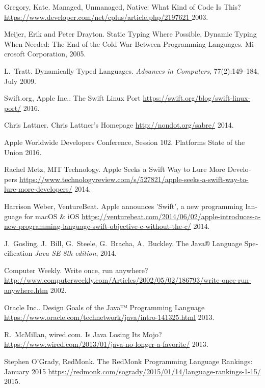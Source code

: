 \begin{thebibliography}{1}
\bibitem{[DEV+03]} {\textlatin{
{Gregory, Kate}.
Managed, Unmanaged, Native: What Kind of Code Is This?
\url{https://www.developer.com/net/cplus/article.php/2197621 }
  2003}}.
  
\bibitem{[MIC05]} {\textlatin{
Meijer, Erik and Peter Drayton. Static Typing Where Possible, Dynamic Typing When Needed: The End of the Cold War Between Programming Languages. Microsoft Corporation, 2005}}.  

\bibitem{[ADV09]} {\textlatin{
L.~Tratt. Dynamically Typed Languages. {\em Advances in Computers}, 77(2):149--184, July 2009}}.  
 
\bibitem{[SWIFT1+16]} {\textlatin{
{Swift.org, Apple Inc.}.
The Swift Linux Port
\url{https://swift.org/blog/swift-linux-port/}
  2016}}.
  
\bibitem{[SWIFT2+14]} {\textlatin{
{Chris Lattner}.
Chris Lattner's Homepage
\url{http://nondot.org/sabre/}
  2014}}.
  
\bibitem{[SWIFT3+14]} {\textlatin{
{Apple Worldwide Developers Conference, Session 102}.
Platforms State of the Union
  2016}}.

\bibitem{[SWIFT4]} {\textlatin{
{ Rachel Metz, MIT Technology}.
Apple Seeks a Swift Way to Lure More Developers
\url{https://www.technologyreview.com/s/527821/apple-seeks-a-swift-way-to-lure-more-developers/}
  2014}}.
  
\bibitem{[SWIFT5]} {\textlatin{
{Harrison Weber, VentureBeat}.
Apple announces 'Swift', a new programming language for macOS & iOS
\url{https://venturebeat.com/2014/06/02/apple-introduces-a-new-programming-language-swift-objective-c-without-the-c/}
  2014}}.

\bibitem{[JAVA1]} {\textlatin{
{J.~Gosling, J.~Bill, G.~Steele, G.~Bracha, A.~Buckley}.
The Java® Language Specification
{\em Java SE 8th edition}, 2014}}.

\bibitem{[JAVA2]} {\textlatin{
{Computer Weekly}.
Write once, run anywhere?
\url{http://www.computerweekly.com/Articles/2002/05/02/186793/write-once-run-anywhere.htm}
  2002}}.
  
\bibitem{[JAVA3]} {\textlatin{
{Oracle Inc.}.
Design Goals of the Java™ Programming Language
\url{https://www.oracle.com/technetwork/java/intro-141325.html}
  2013}}.
  
\bibitem{[JAVA4]} {\textlatin{
{R.~McMillan, wired.com}.
Is Java Losing Its Mojo?
\url{https://www.wired.com/2013/01/java-no-longer-a-favorite/}
  2013}}.
  
\bibitem{[JAVA5]} {\textlatin{
{Stephen O'Grady, RedMonk}.
The RedMonk Programming Language Rankings: January 2015
\url{https://redmonk.com/sogrady/2015/01/14/language-rankings-1-15/}
  2015}}.
  

\end{thebibliography}
